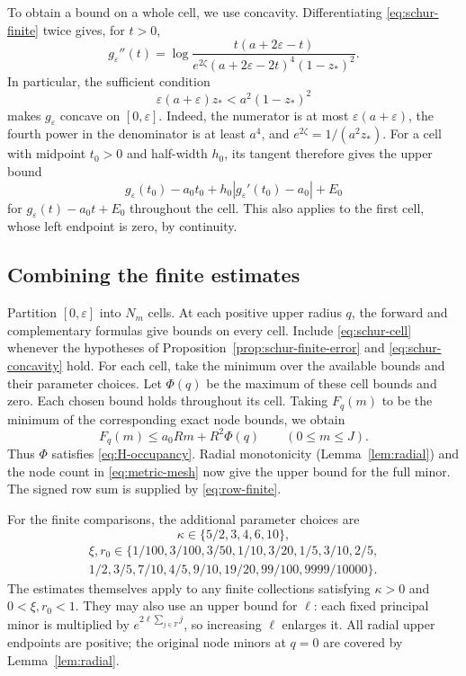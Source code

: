 To obtain a bound on a whole cell, we use concavity. Differentiating
\eqref{eq:schur-finite} twice gives, for $t>0$,
\[
 g_\varepsilon''(t)=
 \log\frac{t(a+2\varepsilon-t)}
 {e^{2\zeta}(a+2\varepsilon-2t)^4(1-z_*)^2}.
\]
In particular, the sufficient condition
\begin{equation}\label{eq:schur-concavity}
 \varepsilon(a+\varepsilon)z_*<a^2(1-z_*)^2
\end{equation}
makes $g_\varepsilon$ concave on $[0,\varepsilon]$. Indeed, the
numerator is at most $\varepsilon(a+\varepsilon)$, the fourth power
in the denominator is at least $a^4$, and
$e^{2\zeta}=1/(a^2z_*)$.
For a cell with midpoint $t_0>0$ and half-width $h_0$, its tangent
therefore gives the upper bound
\begin{equation}\label{eq:schur-cell}
 g_\varepsilon(t_0)-a_0t_0
        +h_0|g_\varepsilon'(t_0)-a_0|+E_0
\end{equation}
for $g_\varepsilon(t)-a_0t+E_0$ throughout the cell. This also applies
to the first cell, whose left endpoint is zero, by continuity.

\subsection{Combining the finite estimates}
Partition $[0,\varepsilon]$ into $N_m$ cells. At each positive upper
radius $q$, the forward and complementary formulas give bounds on every
cell. Include \eqref{eq:schur-cell} whenever the hypotheses of
Proposition~\ref{prop:schur-finite-error} and
\eqref{eq:schur-concavity} hold. For each cell, take the minimum over
the available bounds and their parameter choices. Let $\Phi(q)$ be
the maximum of these cell bounds and zero. Each chosen bound holds
throughout its cell. Taking $F_q(m)$ to be the minimum of the
corresponding exact node bounds, we obtain
\[
 F_q(m)\leq a_0Rm+R^2\Phi(q)\qquad(0\leq m\leq J).
\]
Thus $\Phi$ satisfies \eqref{eq:H-occupancy}. Radial monotonicity
(Lemma~\ref{lem:radial}) and the node count in
\eqref{eq:metric-mesh} now give the upper bound for the full minor.
The signed row sum is supplied by \eqref{eq:row-finite}.

For the finite comparisons, the additional parameter choices are
\[
 \kappa\in\{5/2,3,4,6,10\},
\]
\begin{multline*}
 \xi,r_0\in\{1/100,3/100,3/50,1/10,3/20,1/5,3/10,2/5,\\
                 1/2,3/5,7/10,4/5,9/10,19/20,99/100,9999/10000\}.
\end{multline*}
The estimates themselves apply to any finite collections satisfying
$\kappa>0$ and $0<\xi,r_0<1$. They may also use an upper bound for
$\ell$: each fixed principal minor is multiplied by
$e^{2\ell\sum_{j\in T}j}$, so increasing $\ell$ enlarges it.
All radial upper endpoints are positive; the original node minors at
$q=0$ are covered by Lemma~\ref{lem:radial}.
